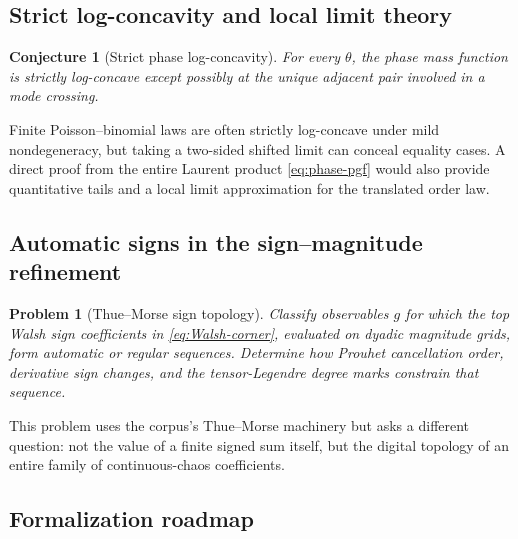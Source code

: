 \documentclass[11pt,oneside]{article}
\newtheorem{conjecture}[theorem]{Conjecture}
\newtheorem{problem}[theorem]{Problem}
\theoremstyle{definition}
\theoremstyle{remark}
\begin{document}
\subsection{Strict log-concavity and local limit theory}

\begin{conjecture}[Strict phase log-concavity]
\label{conj:strict-logconcavity}
For every $\theta$, the phase mass function is strictly log-concave except
possibly at the unique adjacent pair involved in a mode crossing.
\end{conjecture}

Finite Poisson--binomial laws are often strictly log-concave under mild
nondegeneracy, but taking a two-sided shifted limit can conceal equality
cases.  A direct proof from the entire Laurent product
\eqref{eq:phase-pgf} would also provide quantitative tails and a local limit
approximation for the translated order law.

\subsection{Automatic signs in the sign--magnitude refinement}

\begin{problem}[Thue--Morse sign topology]
\label{prob:TM-sign-topology}
Classify observables $g$ for which the top Walsh sign coefficients in
\eqref{eq:Walsh-corner}, evaluated on dyadic magnitude grids, form automatic
or regular sequences.  Determine how Prouhet cancellation order, derivative
sign changes, and the tensor-Legendre degree marks constrain that sequence.
\end{problem}

This problem uses the corpus's Thue--Morse machinery but asks a different
question: not the value of a finite signed sum itself, but the digital topology
of an entire family of continuous-chaos coefficients.

\subsection{Formalization roadmap}
\end{document}
